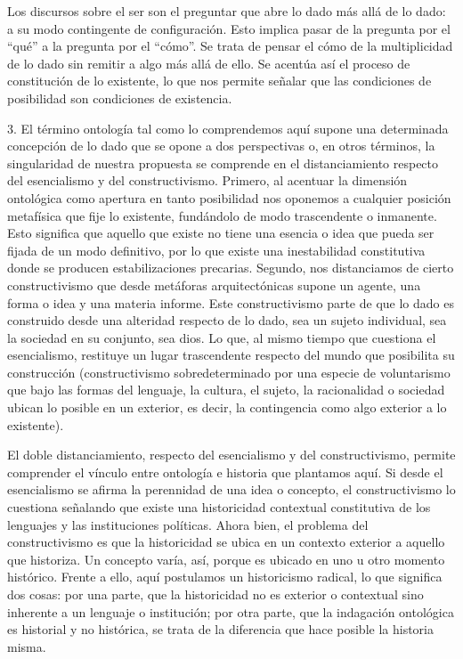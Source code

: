 Los discursos sobre el ser son el preguntar que abre lo dado más allá de
lo dado: a su modo contingente de configuración. Esto implica pasar de
la pregunta por el \enquote{qué} a la pregunta por el \enquote{cómo}. Se trata de pensar
el cómo de la multiplicidad de lo dado sin remitir a algo más allá de
ello. Se acentúa así el proceso de constitución de lo existente, lo que
nos permite señalar que las condiciones de posibilidad son condiciones
de existencia.

3. El término ontología tal como lo comprendemos aquí supone una
determinada concepción de lo dado que se opone a dos perspectivas o, en
otros términos, la singularidad de nuestra propuesta se comprende en el
distanciamiento respecto del esencialismo y del constructivismo.
Primero, al acentuar la dimensión ontológica como apertura en tanto
posibilidad nos oponemos a cualquier posición metafísica que fije lo
existente, fundándolo de modo trascendente o inmanente. Esto significa
que aquello que existe no tiene una esencia o idea que pueda ser fijada
de un modo definitivo, por lo que existe una inestabilidad constitutiva
donde se producen estabilizaciones precarias. Segundo, nos distanciamos
de cierto constructivismo que desde metáforas arquitectónicas supone un
agente, una forma o idea y una materia informe. Este constructivismo
parte de que lo dado es construido desde una alteridad respecto de lo
dado, sea un sujeto individual, sea la sociedad en su conjunto, sea
dios. Lo que, al mismo tiempo que cuestiona el esencialismo, restituye
un lugar trascendente respecto del mundo que posibilita su construcción
(constructivismo sobredeterminado por una especie de voluntarismo que
bajo las formas del lenguaje, la cultura, el sujeto, la racionalidad o
 sociedad ubican lo posible en un exterior, es decir, la contingencia
como algo exterior a lo existente).

El doble distanciamiento, respecto del esencialismo y del
constructivismo, permite comprender el vínculo entre ontología e
historia que plantamos aquí. Si desde el esencialismo se afirma la
perennidad de una idea o concepto, el constructivismo lo cuestiona
señalando que existe una historicidad contextual constitutiva de los
lenguajes y las instituciones políticas. Ahora bien, el problema del
constructivismo es que la historicidad se ubica en un contexto exterior
a aquello que historiza. Un concepto varía, así, porque es ubicado en
uno u otro momento histórico. Frente a ello, aquí postulamos un
historicismo radical, lo que significa dos cosas: por una parte, que la
historicidad no es exterior o contextual sino inherente a un lenguaje o
institución; por otra parte, que la indagación ontológica es historial y
no histórica, se trata de la diferencia que hace posible la historia
misma.

